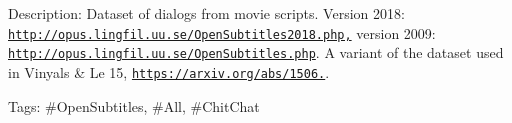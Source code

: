 Description\+: Dataset of dialogs from movie scripts. Version 2018\+: \href{http://opus.lingfil.uu.se/OpenSubtitles2018.php,}{\tt http\+://opus.\+lingfil.\+uu.\+se/\+Open\+Subtitles2018.\+php,} version 2009\+: \href{http://opus.lingfil.uu.se/OpenSubtitles.php}{\tt http\+://opus.\+lingfil.\+uu.\+se/\+Open\+Subtitles.\+php}. A variant of the dataset used in Vinyals \& Le \textquotesingle{}15, \href{https://arxiv.org/abs/1506.05869}{\tt https\+://arxiv.\+org/abs/1506.}.

Tags\+: \#\+Open\+Subtitles, \#\+All, \#\+Chit\+Chat 